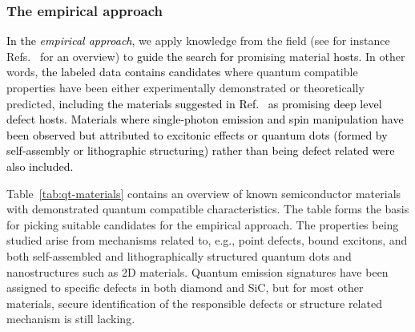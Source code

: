 \documentclass[superscriptaddress,unsortedaddress,
 amsmath,amssymb,
 aps,
]{revtex4-2}
\newcommand{\mrk}[1]{\textcolor{black}{#1}}
\begin{document}
\subsubsection*{The empirical approach} 
\mrk{In the \emph{empirical approach},} we apply knowledge from the field (see for instance  Refs.~\cite{Atatuere2018,Toth2019,Zhang2020,Son2020} for an overview) to \mrk{guide the search for} promising material \mrk{hosts.}  
In other words, \mrk{the labeled data contains candidates} where quantum compatible properties have been either experimentally demonstrated or theoretically predicted\mrk{, including the materials suggested in Ref.~\cite{Weber2010} as promising deep level defect hosts.} 
\mrk{Materials where single-photon emission and spin manipulation have been observed but attributed to excitonic effects or quantum dots (formed by self-assembly or lithographic structuring) rather than being defect related were also included.} 


Table~\ref{tab:qt-materials} contains an overview of known semiconductor materials with demonstrated quantum compatible characteristics. The table forms the basis for picking suitable candidates for the empirical approach. The properties being studied arise from mechanisms related to, e.g., point defects, bound excitons, and both self-assembled and lithographically structured quantum dots and nanostructures such as 2D materials. 
Quantum emission signatures have been assigned to specific defects in both diamond and SiC, but for most other materials, secure identification of the responsible defects or structure related mechanism is still lacking.  
\end{document}

